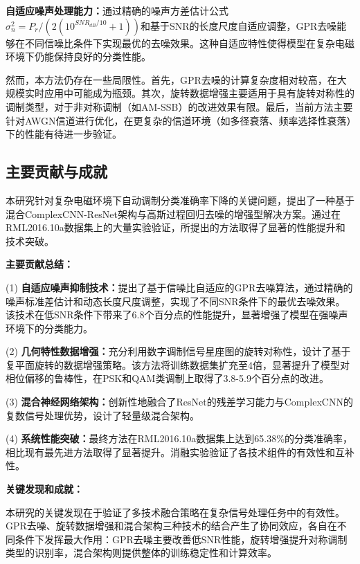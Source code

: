 \documentclass[conference]{IEEEtran}
\begin{document}

\textbf{自适应噪声处理能力：}通过精确的噪声方差估计公式$\sigma_n^2 = P_r/(2(10^{SNR_{dB}/10} + 1))$和基于SNR的长度尺度自适应调整，GPR去噪能够在不同信噪比条件下实现最优的去噪效果。这种自适应特性使得模型在复杂电磁环境下仍能保持良好的分类性能。

然而，本方法仍存在一些局限性。首先，GPR去噪的计算复杂度相对较高，在大规模实时应用中可能成为瓶颈。其次，旋转数据增强主要适用于具有旋转对称性的调制类型，对于非对称调制（如AM-SSB）的改进效果有限。最后，当前方法主要针对AWGN信道进行优化，在更复杂的信道环境（如多径衰落、频率选择性衰落）下的性能有待进一步验证。

\subsection{主要贡献与成就}

本研究针对复杂电磁环境下自动调制分类准确率下降的关键问题，提出了一种基于混合ComplexCNN-ResNet架构与高斯过程回归去噪的增强型解决方案。通过在RML2016.10a数据集上的大量实验验证，所提出的方法取得了显著的性能提升和技术突破。

\textbf{主要贡献总结：}

(1) \textbf{自适应噪声抑制技术：}提出了基于信噪比自适应的GPR去噪算法，通过精确的噪声标准差估计和动态长度尺度调整，实现了不同SNR条件下的最优去噪效果。该技术在低SNR条件下带来了6.8个百分点的性能提升，显著增强了模型在强噪声环境下的分类能力。

(2) \textbf{几何特性数据增强：}充分利用数字调制信号星座图的旋转对称性，设计了基于复平面旋转的数据增强策略。该方法将训练数据集扩充至4倍，显著提升了模型对相位偏移的鲁棒性，在PSK和QAM类调制上取得了3.8-5.9个百分点的改进。

(3) \textbf{混合神经网络架构：}创新性地融合了ResNet的残差学习能力与ComplexCNN的复数信号处理优势，设计了轻量级混合架构。

(4) \textbf{系统性能突破：}最终方法在RML2016.10a数据集上达到65.38\%的分类准确率，相比现有最先进方法取得了显著提升。消融实验验证了各技术组件的有效性和互补性。

\textbf{关键发现和成就：}

本研究的关键发现在于验证了多技术融合策略在复杂信号处理任务中的有效性。GPR去噪、旋转数据增强和混合架构三种技术的结合产生了协同效应，各自在不同条件下发挥最大作用：GPR去噪主要改善低SNR性能，旋转增强提升对称调制类型的识别率，混合架构则提供整体的训练稳定性和计算效率。
\end{document}
